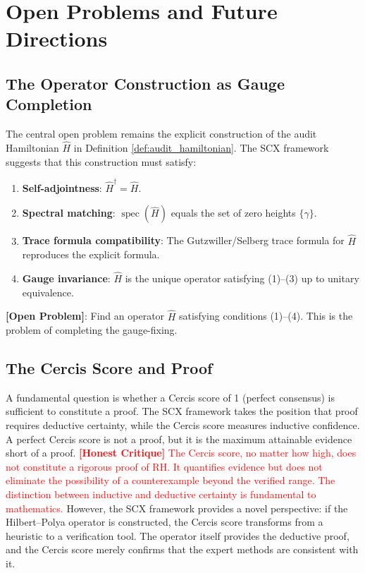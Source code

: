 \documentclass[12pt,a4paper]{article}
\theoremstyle{remark}
\DeclareMathOperator{\spec}{spec}
\newcommand{\openproblem}{\textbf{[Open Problem]}}
\newcommand{\honestcrit}[1]{\textcolor{red}{\textbf{[Honest Critique]} #1}}
\begin{document}
\section{Open Problems and Future Directions}
\label{sec:open}
\subsection{The Operator Construction as Gauge Completion}
\label{sec:open_operator}
The central open problem remains the explicit construction of the audit
Hamiltonian $\widehat{H}$ in Definition \ref{def:audit_hamiltonian}. The
SCX framework suggests that this construction must satisfy:
\begin{enumerate}
  \item \textbf{Self-adjointness}: $\widehat{H}^{\dagger} = \widehat{H}$.
  \item \textbf{Spectral matching}: $\spec(\widehat{H})$ equals the set of
        zero heights $\{\gamma\}$.
  \item \textbf{Trace formula compatibility}: The Gutzwiller/Selberg trace
        formula for $\widehat{H}$ reproduces the explicit formula.
  \item \textbf{Gauge invariance}: $\widehat{H}$ is the unique operator
        satisfying (1)--(3) up to unitary equivalence.
\end{enumerate}
\openproblem: Find an operator $\widehat{H}$ satisfying conditions
(1)--(4). This is the problem of completing the gauge-fixing.
\subsection{The Cercis Score and Proof}
\label{sec:cercis_proof}
A fundamental question is whether a Cercis score of 1 (perfect consensus)
is sufficient to constitute a proof. The SCX framework takes the position
that proof requires deductive certainty, while the Cercis score measures
inductive confidence. A perfect Cercis score is not a proof, but it is the
maximum attainable evidence short of a proof.
\honestcrit{The Cercis score, no matter how high, does not constitute a
rigorous proof of RH. It quantifies evidence but does not eliminate the
possibility of a counterexample beyond the verified range. The distinction
between inductive and deductive certainty is fundamental to mathematics.}
However, the SCX framework provides a novel perspective: if the
Hilbert--Polya operator is constructed, the Cercis score transforms from
a heuristic to a verification tool. The operator itself provides the
deductive proof, and the Cercis score merely confirms that the expert
methods are consistent with it.
\end{document}
